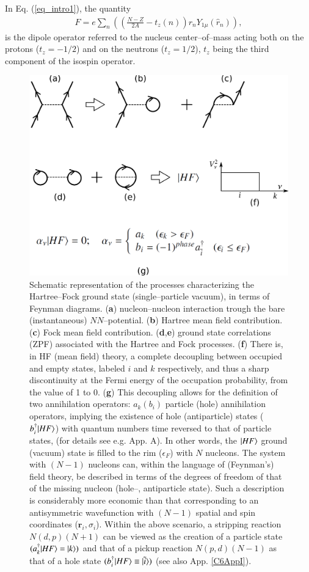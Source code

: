 In Eq. (\ref{eq_intro1}), the quantity 
\begin{align}\label{eq1.2.4}
F=e\sum_n\left(\left(\frac{N-Z}{2A}-t_z(n)\right)r_nY_{1\mu}(\hat r_n)\right),
\end{align}
is the dipole operator referred to the nucleus center--of--mass acting both on the  protons ($t_z=-1/2$) and on the neutrons ($t_z=1/2$), $t_z$ being the third component of the isospin operator.
\begin{figure}
\centerline {
\includegraphics*[width=12cm]{introduccion/figs/figintro4}
}
\caption{Schematic representation of the processes characterizing the Hartree--Fock ground state (single--particle vacuum), in terms of Feynman diagrams. (\textbf{a}) nucleon--nucleon interaction trough the bare (instantaneous) $NN$--potential. (\textbf{b}) Hartree mean field contribution. (\textbf{c}) Fock mean field contribution. (\textbf{d},\textbf{e}) ground state correlations (ZPF) associated with the Hartree and Fock processes. (\textbf{f}) There is, in HF (mean field) theory, a complete decoupling between occupied and empty states, labeled $i$ and $k$ respectively, and thus a sharp discontinuity at the Fermi energy of the occupation probability, from the value of 1 to 0. (\textbf{g}) This decoupling allows for the definition of two annihilation operators: $a_k(b_i)$ particle (hole) annihilation operators,   implying the existence of hole (antiparticle) states ($b^\dagger_i|{HF} \rangle$) with quantum numbers time reversed to that of particle states, (for details see e.g. \cite{Brink:05} App. A). In other words, the $|{HF} \rangle$ ground (vacuum) state is filled to the rim ($\epsilon_F$) with $N$ nucleons. The system with $(N-1)$ nucleons can, within the language of (Feynman's) field theory, be described in terms of the degrees of freedom of that of the missing nucleon (hole--, antiparticle state). Such a description is  considerably more economic than that corresponding to an antisymmetric wavefunction with $(N-1)$ spatial and spin coordinates ($\mathbf r_i,\sigma_i$). Within the above scenario, a stripping reaction $N(d,p)(N+1)$ can be viewed as the creation of a particle state $(a^\dagger_k|{HF} \rangle=|{k} \rangle)$ and that of a pickup reaction $N(p,d)(N-1)$ as that of a hole state $(b^\dagger_i|{HF} \rangle\equiv|{\tilde i} \rangle)$ (see also App. \ref{C6AppI}).}
\label{figintro4}
\end{figure}

